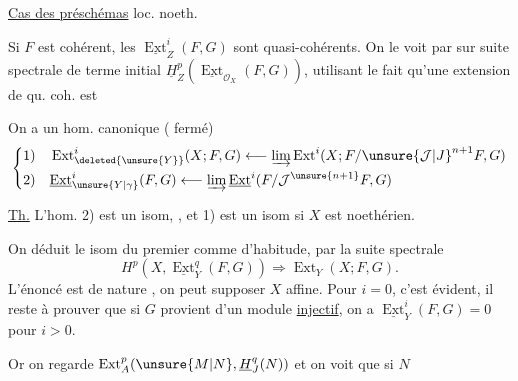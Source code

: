 \uline{Cas des préschémas} loc. noeth.

Si $F$ est cohérent, les $\underline{\operatorname{Ext}}^i_Z(F,G)$ sont quasi-cohérents. On le voit par  sur  suite spectrale de terme initial $\underline{H}^p_Z(\underline{\operatorname{Ext}}_{\mathcal O_X}(F,G))$, utilisant le fait qu'une extension de qu. coh. est  

On a un hom. canonique ( fermé)
\[
\left\{\begin{aligned}
1)\quad &\operatorname{Ext}^i_{\deleted{\unsure{Y}}}(X;F,G)\longleftarrow\varinjlim\operatorname{Ext}^i(X;F/\unsure{\mathcal J|J}^{n+1}F,G)\\
2)\quad &\underline{\operatorname{Ext}}^i_{\unsure{Y|\gamma}}(F,G)\longleftarrow\varinjlim\underline{\operatorname{Ext}}^i(F/\mathcal J^{\unsure{n+1}}F,G)
\end{aligned}\right.
\]

\uline{Th.}  L'hom. 2) est un isom, , et 1) est un isom si $X$ est noethérien.

On déduit  le  isom du premier comme d'habitude, par la suite spectrale
\[
H^p(X,\underline{\operatorname{Ext}}^q_Y(F,G))\Longrightarrow\operatorname{Ext}_Y(X;F,G).
\]
L'énoncé est de nature \uline{}, on peut supposer $X$ affine. Pour $i=0$, c'est évident, il reste à  prouver que si $G$ provient d'un module \uline{injectif}, on a $\underline{\operatorname{Ext}}^i_Y(F,G)=0$ pour $i>0$.

Or on regarde $\operatorname{Ext}^p_A(\unsure{M|N},\underline{H}^q_J(N))$ et on voit que si $N$
